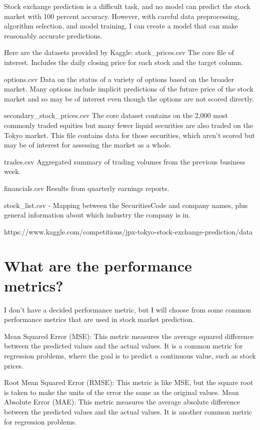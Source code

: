 \documentclass{article}
\begin{document}
Stock exchange prediction is a difficult task, and no model can predict the stock market with 100 percent accuracy. However, with careful data preprocessing, algorithm selection, and model training, I can create a model that can make reasonably accurate predictions. 

Here are the datasets provided by Kaggle:
stock\_prices.csv The core file of interest. Includes the daily closing price for each stock and the target column.

options.csv Data on the status of a variety of options based on the broader market. Many options include implicit predictions of the future price of the stock market and so may be of interest even though the options are not scored directly.

secondary\_stock\_prices.csv The core dataset contains on the 2,000 most commonly traded equities but many fewer liquid securities are also traded on the Tokyo market. 
This file contains data for those securities, which aren't scored but may be of interest for assessing the market as a whole.

trades.csv Aggregated summary of trading volumes from the previous business week.

financials.csv Results from quarterly earnings reports.

stock\_list.csv - Mapping between the SecuritiesCode and company names, plus general information about which industry the company is in.

https://www.kaggle.com/competitions/jpx-tokyo-stock-exchange-prediction/data



\section{What are the performance metrics?}
I don’t have a decided performance metric, but I will choose from some common performance metrics that are used in stock market prediction. 

Mean Squared Error (MSE): This metric measures the average squared difference between the predicted values and the actual values. It is a common metric for regression problems, where the goal is to predict a continuous value, such as stock prices.

Root Mean Squared Error (RMSE): This metric is like MSE, but the square root is taken to make the units of the error the same as the original values.
Mean Absolute Error (MAE): This metric measures the average absolute difference between the predicted values and the actual values. It is another common metric for regression problems.
\end{document}
